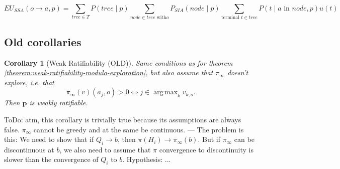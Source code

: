 \documentclass{article}
\DeclareMathOperator*{\argmax}{arg\,max}
\newtheorem{corollary}[thm]{Corollary}
\begin{document}
\begin{equation}
EU_{SSA}(o\rightarrow a,p)=\sum_{tree\in T} P(tree\mid p) \sum_{node\in tree\text{ with} o} P_{SIA}(node \mid p) \sum_{\text{terminal }t\in tree} P(t \mid a\text{ in }node, p) u(t)
\end{equation}

\subsection*{Old corollaries}

\begin{corollary}[Weak Ratifiability (OLD)]
Same conditions as for theorem \ref{theorem:weak-ratifiability-modulo-exploration}, but also assume that $\pi_\infty$ doesn't explore, i.e. that
\begin{equation}
\pi_\infty(v)(a_j,o) >0 \iff j\in \argmax_k v_{k, o}.
\end{equation}
Then $\mathbf{p}$ is weakly ratifiable.
\end{corollary}

ToDo: atm, this corollary is trivially true because its assumptions are always false. $\pi_\infty$ cannot be greedy and at the same be continuous. --- The problem is this: We need to show that if $Q_i\rightarrow b$, then $\pi(H_i)\rightarrow \pi_\infty (b)$. But if $\pi_\infty$ can be discontinuous at $b$, we also need to assume that $\pi$ convergence to discontinuity is slower than the convergence of $Q_i$ to $b$. Hypothesis: ...
\end{document}
